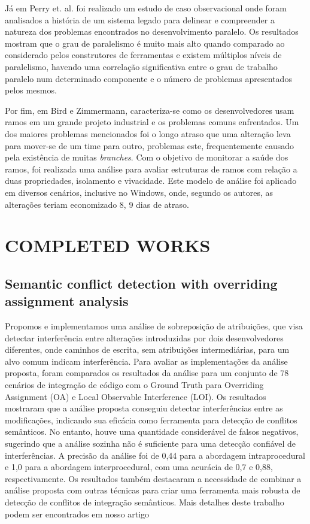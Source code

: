 \documentclass[sigconf,review]{acmart}
\begin{document}
Já em Perry et. al.\cite{10.1145/383876.383878} foi realizado um estudo de caso observacional onde foram analisados a história de um sistema legado para delinear e compreender a natureza dos problemas encontrados no desenvolvimento paralelo. Os resultados mostram que o grau de paralelismo é muito mais alto quando comparado ao considerado pelos construtores de ferramentas e existem múltiplos níveis de paralelismo, havendo uma correlação significativa entre o grau de trabalho paralelo num determinado componente e o número de problemas apresentados pelos mesmos. 

Por fim, em Bird e Zimmermann\cite{Bird2012AssessingTV}, caracteriza-se como os desenvolvedores usam ramos em um grande projeto industrial e os problemas comuns enfrentados. Um dos maiores problemas mencionados foi o longo atraso que uma alteração leva para mover-se de um time para outro, problemas este, frequentemente causado pela existência de muitas \emph{branches}. Com o objetivo de monitorar a saúde dos ramos, foi realizada uma análise para avaliar estruturas de ramos com relação a duas propriedades, isolamento e vivacidade. Este modelo de análise foi aplicado em diversos cenários, inclusive no Windows, onde, segundo os autores, as alterações teriam economizado 8, 9 dias de atraso.



\section{COMPLETED WORKS}

\subsection{Semantic conflict detection with overriding assignment analysis}
Propomos e implementamos uma análise de sobreposição de atribuições, que visa detectar interferência entre alterações introduzidas por dois desenvolvedores diferentes, onde caminhos de escrita, sem atribuições intermediárias, para um alvo comum indicam interferência. Para avaliar as implementações da análise proposta, foram comparados os resultados da análise para um conjunto de 78 cenários de integração de código com o Ground Truth para Overriding Assignment (OA) e Local Observable Interference (LOI). Os resultados mostraram que a análise proposta conseguiu detectar interferências entre as modificações, indicando sua eficácia como ferramenta para detecção de conflitos semânticos. No entanto, houve uma quantidade considerável de falsos negativos, sugerindo que a análise sozinha não é suficiente para uma detecção confiável de interferências. A precisão da análise foi de 0,44 para a abordagem intraprocedural e 1,0 para a abordagem interprocedural, com uma acurácia de 0,7 e 0,88, respectivamente. Os resultados também destacaram a necessidade de combinar a análise proposta com outras técnicas para criar uma ferramenta mais robusta de detecção de conflitos de integração semânticos. 
Mais detalhes deste trabalho podem ser encontrados em nosso artigo \cite{10.1145/3555228.3555242}
\end{document}
